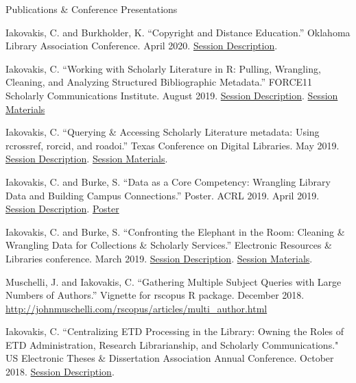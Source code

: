 \documentclass{resume} %
\begin{document}
\begin{rSection}{Publications \& Conference Presentations}
\begin{rSubsectionConf}{2em}
Iakovakis, C. and Burkholder, K. “Copyright and Distance Education.” Oklahoma Library Association Conference. April 2020. \href{https://www.oklibs.org/page/OLA2020_24_Friday}{Session Description}.

Iakovakis, C. ``Working with Scholarly Literature in R: Pulling, Wrangling, Cleaning, and Analyzing Structured Bibliographic Metadata.'' FORCE11 Scholarly Communications Institute. August 2019. \href{https://www.force11.org/fsci/2019/course-abstracts#AM4}{Session Description}. \href{https://ciakovx.github.io/fsci_syllabus.html}{Session Materials}
 
Iakovakis, C. ``Querying \& Accessing Scholarly Literature metadata: Using rcrossref, rorcid, and roadoi.'' Texas Conference on Digital Libraries. May 2019. \href{https://www.tdl.org/tcdl-2019/tcdl-2019-pre-conference-registration/}{Session Description}. \href{https://tdl-ir.tdl.org/handle/2249.1/156426}{Session Materials}.

Iakovakis, C. and Burke, S. ``Data as a Core Competency: Wrangling Library Data and Building Campus Connections.'' Poster. ACRL 2019. April 2019. \href{http://s4.goeshow.com/acrl/national/2019/profile.cfm?profile_name=session&master_key=681FAAEE-D282-252F-ED91-91AC04A95FCD&page_key=126CB9A0-B53A-2A1E-9827-DF2938A26C80&xtemplate&userLGNKEY=0}{Session Description}. \href{https://acrl2019-acrl.ipostersessions.com/default.aspx?s=04-FE-E6-99-F3-96-80-C4-1A-16-1C-00-A7-39-6F-2A}{Poster}
 
Iakovakis, C. and Burke, S. ``Confronting the Elephant in the Room: Cleaning \& Wrangling Data for Collections \& Scholarly Services.'' Electronic Resources \& Libraries conference. March 2019. \href{https://erl19.sched.com/event/I8Cx/s54-confronting-the-elephant-in-the-room-cleaning-and-wrangling-data-for-collections-and-scholarly-services}{Session Description}. \href{https://osf.io/a5p3r/}{Session Materials}.

Muschelli, J. and Iakovakis, C. ``Gathering Multiple Subject Queries with Large Numbers of Authors.” Vignette for rscopus R package. December 2018. \url{http://johnmuschelli.com/rscopus/articles/multi_author.html}

Iakovakis, C. ``Centralizing ETD Processing in the Library: Owning the Roles of ETD Administration, Research Librarianship, and Scholarly Communications." US Electronic Theses \& Dissertation Association Annual Conference. October 2018. \href{http://www.ocs.usetda.org/index.php/USETDA/USETDA2018/paper/view/138}{Session Description}.


\end{rSubsectionConf}
\end{rSection}
\end{document}
